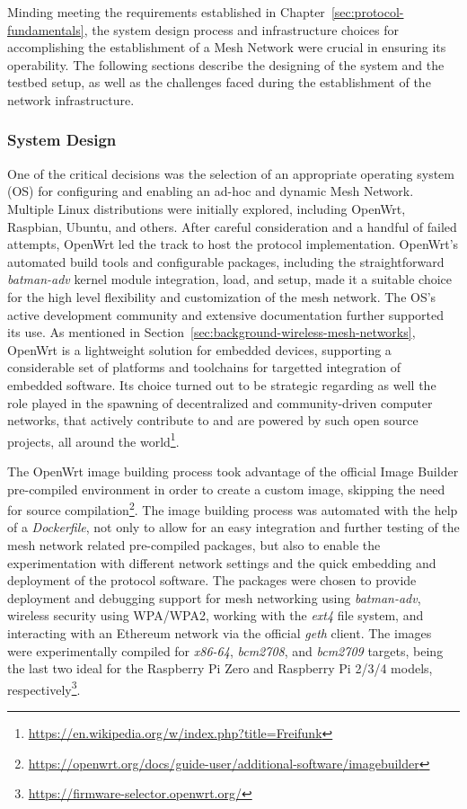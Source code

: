 Minding meeting the requirements established in Chapter~\ref{sec:protocol-fundamentals}, the system design process and infrastructure choices for accomplishing the establishment of a Mesh Network were crucial in ensuring its operability. The following sections describe the designing of the system and the testbed setup, as well as the challenges faced during the establishment of the network infrastructure.

\subsubsection{System Design} \label{sec:infrastructure}

One of the critical decisions was the selection of an appropriate operating system (OS) for configuring and enabling an ad-hoc and dynamic Mesh Network. Multiple Linux distributions were initially explored, including OpenWrt, Raspbian, Ubuntu, and others. After careful consideration and a handful of failed attempts, OpenWrt led the track to host the protocol implementation. OpenWrt's automated build tools and configurable packages, including the straightforward \emph{batman-adv} kernel module integration, load, and setup, made it a suitable choice for the high level flexibility and customization of the mesh network. The OS's active development community and extensive documentation further supported its use. As mentioned in Section~\ref{sec:background-wireless-mesh-networks}, OpenWrt is a lightweight solution for embedded devices, supporting a considerable set of platforms and toolchains for targetted integration of embedded software. Its choice turned out to be strategic regarding as well the role played in the spawning of decentralized and community-driven computer networks, that actively contribute to and are powered by such open source projects, all around the world\footnote{\url{https://en.wikipedia.org/w/index.php?title=Freifunk}}.

The OpenWrt image building process took advantage of the official Image Builder pre-compiled environment in order to create a custom image, skipping the need for source compilation\footnote{\url{https://openwrt.org/docs/guide-user/additional-software/imagebuilder}}. The image building process was automated with the help of a \emph{Dockerfile}, not only to allow for an easy integration and further testing of the mesh network related pre-compiled packages, but also to enable the experimentation with different network settings and the quick embedding and deployment of the \pol{} protocol software. The packages were chosen to provide deployment and debugging support for mesh networking using \emph{batman-adv}, wireless security using WPA/WPA2, working with the \emph{ext4} file system, and interacting with an Ethereum network via the official \emph{geth} client. The images were experimentally compiled for \emph{x86-64}, \emph{bcm2708}, and \emph{bcm2709} targets, being the last two ideal for the Raspberry Pi Zero and Raspberry Pi 2/3/4 models, respectively\footnote{\url{https://firmware-selector.openwrt.org/}}.

